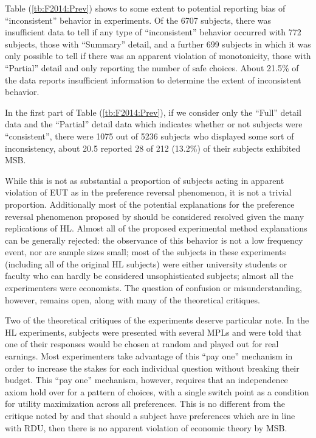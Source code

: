 \documentclass[../main.tex]{subfiles}
\begin{document}
Table (\ref{tb:F2014:Prev}) shows to some extent to potential reporting bias of \enquote{inconsistent} behavior in experiments.
Of the 6707 subjects, there was insufficient data to tell if any type of \enquote{inconsistent} behavior occurred with 772 subjects, those with \enquote{Summary} detail, and a further 699 subjects in which it was only possible to tell if there was an apparent violation of monotonicity, those with \enquote{Partial} detail and only reporting the number of safe choices.
About 21.5\% of the data reports insufficient information to determine the extent of inconsistent behavior.

In the first part of Table (\ref{tb:F2014:Prev}), if we consider only the \enquote{Full} detail data and the \enquote{Partial} detail data which indicates whether or not subjects were \enquote{consistent}, there were 1075 out of 5236 subjects who displayed some sort of inconsistency, about 20.5%
\textcite[1647]{Holt2002} reported 28 of 212 (13.2\%) of their subjects exhibited MSB.

While this is not as substantial a proportion of subjects acting in apparent violation of EUT as in the \textcite{Grether1979} preference reversal phenomenon, it is not a trivial proportion.
Additionally most of the potential explanations for the preference reversal phenomenon proposed by \textcite{Grether1979} should be considered resolved given the many replications of HL.
Almost all of the proposed experimental method explanations can be generally rejected: the observance of this behavior is not a low frequency event, nor are sample sizes small; most of the subjects in these experiments (including all of the original HL subjects) were either university students or faculty who can hardly be considered unsophisticated subjects; almost all the experimenters were economists.
The question of confusion or misunderstanding, however, remains open, along with many of the theoretical critiques.

Two of the theoretical critiques of the \textcite{Grether1979} experiments deserve particular note.
In the HL experiments, subjects were presented with several MPLs and were told that one of their responses would be chosen at random and played out for real earnings.
Most experimenters take advantage of this \enquote{pay one} mechanism in order to increase the stakes for each individual question without breaking their budget.
This \enquote{pay one} mechanism, however, requires that an independence axiom hold over for a pattern of choices, with a single switch point as a condition for utility maximization across all preferences.
This is no different from the critique noted by \textcite{Holt1986} and \textcite{Karni1987} that should a subject have preferences which are in line with RDU, then there is no apparent violation of economic theory by MSB.
\end{document}

